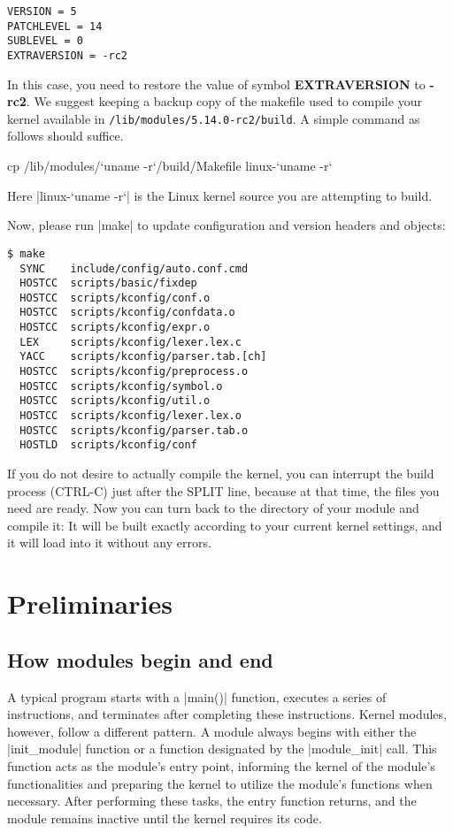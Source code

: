 \documentclass[10pt, oneside]{book}
\begin{document}
\begin{verbatim}
VERSION = 5
PATCHLEVEL = 14
SUBLEVEL = 0
EXTRAVERSION = -rc2
\end{verbatim}

In this case, you need to restore the value of symbol \textbf{EXTRAVERSION} to \textbf{-rc2}.
We suggest keeping a backup copy of the makefile used to compile your kernel available in \verb|/lib/modules/5.14.0-rc2/build|.
A simple command as follows should suffice.
\begin{codebash}
cp /lib/modules/`uname -r`/build/Makefile linux-`uname -r`
\end{codebash}
Here \sh|linux-`uname -r`| is the Linux kernel source you are attempting to build.

Now, please run \sh|make| to update configuration and version headers and objects:

\begin{verbatim}
$ make
  SYNC    include/config/auto.conf.cmd
  HOSTCC  scripts/basic/fixdep
  HOSTCC  scripts/kconfig/conf.o
  HOSTCC  scripts/kconfig/confdata.o
  HOSTCC  scripts/kconfig/expr.o
  LEX     scripts/kconfig/lexer.lex.c
  YACC    scripts/kconfig/parser.tab.[ch]
  HOSTCC  scripts/kconfig/preprocess.o
  HOSTCC  scripts/kconfig/symbol.o
  HOSTCC  scripts/kconfig/util.o
  HOSTCC  scripts/kconfig/lexer.lex.o
  HOSTCC  scripts/kconfig/parser.tab.o
  HOSTLD  scripts/kconfig/conf
\end{verbatim}

If you do not desire to actually compile the kernel, you can interrupt the build process (CTRL-C) just after the SPLIT line, because at that time, the files you need are ready.
Now you can turn back to the directory of your module and compile it: It will be built exactly according to your current kernel settings, and it will load into it without any errors.

\section{Preliminaries}
\subsection{How modules begin and end}
\label{sec:module_init_exit}
A typical program starts with a \cpp|main()| function, executes a series of instructions,
and terminates after completing these instructions.
Kernel modules, however, follow a different pattern.
A module always begins with either the \cpp|init_module| function or a function designated by the \cpp|module_init| call.
This function acts as the module's entry point,
informing the kernel of the module's functionalities and preparing the kernel to utilize the module's functions when necessary.
After performing these tasks, the entry function returns, and the module remains inactive until the kernel requires its code.
\end{document}
